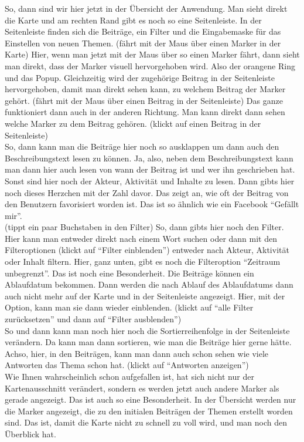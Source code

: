 \begin{itemize}
So, dann sind wir hier jetzt in der {\"U}bersicht der Anwendung. Man sieht direkt die Karte und am rechten Rand gibt es noch so eine Seitenleiste. In der Seitenleiste finden sich die Beitr{\"a}ge, ein Filter und die Eingabemaske f{\"u}r das Einstellen von neuen Themen. (f{\"a}hrt mit der Maus {\"u}ber einen Marker in der Karte) Hier, wenn man jetzt mit der Maus {\"u}ber so einen Marker f{\"a}hrt, dann sieht man direkt, dass der Marker visuell hervorgehoben wird. Also der orangene Ring und das Popup. Gleichzeitig wird der zugeh{\"o}rige Beitrag in der Seitenleiste hervorgehoben, damit man direkt sehen kann, zu welchem Beitrag der Marker geh{\"o}rt. (f{\"a}hrt mit der Maus {\"u}ber einen Beitrag in der Seitenleiste) Das ganze funktioniert dann auch in der anderen Richtung. Man kann direkt dann sehen welche Marker zu dem Beitrag geh{\"o}ren. (klickt auf einen Beitrag in der Seitenleiste)\\
So, dann kann man die Beitr{\"a}ge hier noch so ausklappen um dann auch den Beschreibungstext lesen zu k{\"o}nnen. Ja, also, neben dem Beschreibungstext kann man dann hier auch lesen von wann der Beitrag ist und wer ihn geschrieben hat. Sonst sind hier noch der Akteur, Aktivit{\"a}t und Inhalte zu lesen. Dann gibts hier noch dieses Herzchen mit der Zahl davor. Das zeigt an, wie oft der Beitrag von den Benutzern favorisiert worden ist. Das ist so {\"a}hnlich wie ein Facebook "`Gef{\"a}llt mir"'.\\
(tippt ein paar Buchstaben in den Filter) So, dann gibts hier noch den Filter. Hier kann man entweder direkt nach einem Wort suchen oder dann mit den Filteroptionen (klickt auf "`Filter einblenden"') entweder nach Akteur, Aktivit{\"a}t oder Inhalt filtern. Hier, ganz unten, gibt es noch die Filteroption "`Zeitraum unbegrenzt"'. Das ist noch eine Besonderheit. Die Beitr{\"a}ge k{\"o}nnen ein Ablaufdatum bekommen. Dann werden die nach Ablauf des Ablaufdatums dann auch nicht mehr auf der Karte und in der Seitenleiste angezeigt. Hier, mit der Option, kann man sie dann wieder einblenden. (klickt auf "`alle Filter zur{\"u}cksetzen"' und dann auf "`Filter ausblenden"')\\
So und dann kann man noch hier noch die Sortierreihenfolge in der Seitenleiste ver{\"a}ndern. Da kann man dann sortieren, wie man die Beitr{\"a}ge hier gerne h{\"a}tte. Achso, hier, in den Beitr{\"a}gen, kann man dann auch schon sehen wie viele Antworten das Thema schon hat. (klickt auf "`Antworten anzeigen"')\\
Wie Ihnen wahrscheinlich schon aufgefallen ist, hat sich nicht nur der Kartenausschnitt ver{\"a}ndert, sondern es werden jetzt auch andere Marker als gerade angezeigt. Das ist auch so eine Besonderheit. In der {\"U}bersicht werden nur die Marker angezeigt, die zu den initialen Beitr{\"a}gen der Themen erstellt worden sind. Das ist, damit die Karte nicht zu schnell zu voll wird, und man noch den {\"U}berblick hat.\\

\end{itemize}

